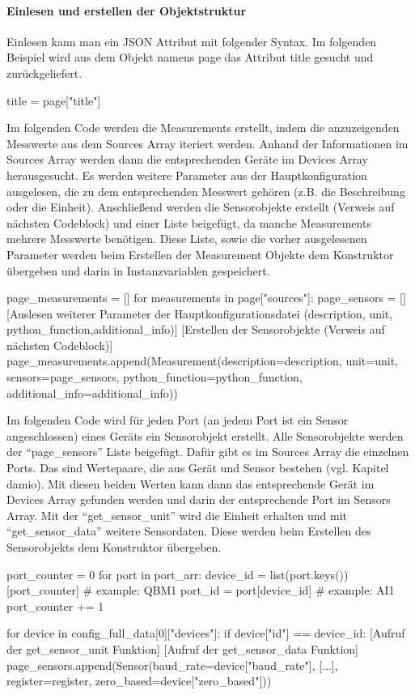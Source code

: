 \paragraph{Einlesen und erstellen der Objektstruktur}
Einlesen kann man ein JSON Attribut mit folgender Syntax. Im folgenden Beispiel wird aus dem Objekt namens page das Attribut title gesucht und zurückgeliefert.
\begin{pythoncode}
title = page["title"]
\end{pythoncode}

Im folgenden Code werden die Measurements erstellt, indem die anzuzeigenden Messwerte aus dem Sources Array iteriert werden. Anhand der Informationen im Sources Array werden dann die entsprechenden Geräte im Devices Array herausgesucht. Es werden weitere Parameter aus der Hauptkonfiguration ausgelesen, die zu dem entsprechenden Messwert gehören (z.B. die Beschreibung oder die Einheit). Anschließend werden die Sensorobjekte erstellt (Verweis auf nächsten Codeblock) und einer Liste beigefügt, da manche Measurements mehrere Messwerte benötigen. Diese Liste, sowie die vorher ausgelesenen Parameter werden beim Erstellen der Measurement Objekte dem Konstruktor übergeben und darin in Instanzvariablen gespeichert.
\begin{pythoncode}
page_measurements = []
for measurements in page["sources"]:
	page_sensors = []
	[Auslesen weiterer Parameter der Hauptkonfigurationsdatei (description, unit, python_function,additional_info)]
	[Erstellen der Sensorobjekte (Verweis auf nächsten Codeblock)]
	page_measurements.append(Measurement(description=description, unit=unit, sensors=page_sensors, python_function=python_function, additional_info=additional_info))
\end{pythoncode}

Im folgenden Code wird für jeden Port (an jedem Port ist ein Sensor angeschlossen) eines Geräts ein Sensorobjekt erstellt. Alle Sensorobjekte werden der \enquote{page\_sensors} Liste beigefügt. Dafür gibt es im Sources Array die einzelnen Ports. Das sind Wertepaare, die aus Gerät und Sensor bestehen (vgl. Kapitel damio). Mit diesen beiden Werten kann dann das entsprechende Gerät im Devices Array gefunden werden und darin der entsprechende Port im Sensors Array. Mit der \enquote{get\_sensor\_unit} wird die Einheit erhalten und mit \enquote{get\_sensor\_data} weitere Sensordaten. Diese werden beim Erstellen des Sensorobjekts dem Konstruktor übergeben.
\begin{pythoncode}
port_counter = 0
for port in port_arr:
	device_id = list(port.keys())[port_counter] # example: QBM1
	port_id = port[device_id]  # example: AI1
	port_counter += 1
	
	for device in config_full_data[0]["devices"]:
		if device["id"] == device_id:
			[Aufruf der get_sensor_unit Funktion]
			[Aufruf der get_sensor_data Funktion]
			page_sensors.append(Sensor(baud_rate=device["baud_rate"], [...], register=register, zero_based=device["zero_based"]))	
\end{pythoncode}

